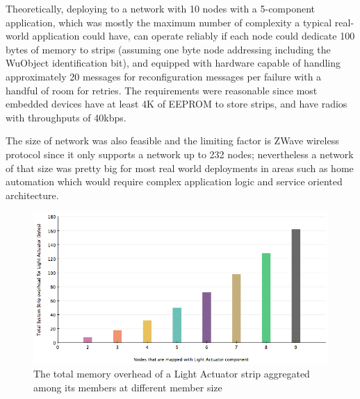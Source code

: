 Theoretically, deploying to a network with 10 nodes with a 5-component
application, which was mostly the maximum number of complexity a typical
real-world application could have, can operate reliably if each node could
dedicate 100 bytes of memory to strips (assuming one byte node addressing
including the WuObject identification bit), and equipped with hardware capable
of handling approximately 20 messages for reconfiguration messages per failure
with a handful of room for retries. The requirements were reasonable since most
embedded devices have at least 4K of EEPROM to store strips, and have radios
with throughputs of 40kbps.

The size of network was also feasible and the limiting factor is ZWave wireless
protocol since it only supports a network up to 232 nodes; nevertheless
a network of that size was pretty big for most real world deployments in areas
such as home automation which would require complex application logic and
service oriented architecture.

\begin{figure}[h!]
\centering
    \includegraphics[width=\linewidth]{figures/results-system-overhead-vs-network-size}
\caption{The total memory overhead of a Light Actuator strip aggregated among its members at different member size}
\label{fig:results-system-overhead-vs-network-size}
\end{figure}


